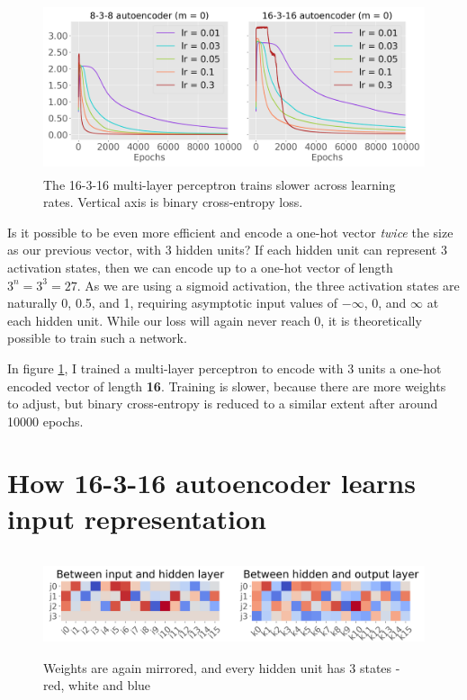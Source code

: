 \documentclass[12pt]{article}
\begin{document}
\begin{figure}[htbp]
    \centering
    \includegraphics[width=12cm, height=5cm]{mlp_8_16}
    \caption{The 16-3-16 multi-layer perceptron trains slower across learning rates. Vertical axis is binary cross-entropy loss.}
    \label{fig:mlp_8_16}
\end{figure}
Is it possible to be even more efficient and encode a one-hot vector \textit{twice} the size as our previous vector, with 3 hidden units? If each hidden unit can represent 3 activation states, then we can encode up to a one-hot vector of length $3^n = 3^3 = 27$. As we are using a sigmoid activation, the three activation states are naturally 0, 0.5, and 1, requiring asymptotic input values of $-\infty$, 0, and $\infty$ at each hidden unit. While our loss will again never reach 0, it is theoretically possible to train such a network.

In figure \ref{fig:mlp_8_16}, I trained a multi-layer perceptron to encode with 3 units a one-hot encoded vector of length \textbf{16}. Training is slower, because there are more weights to adjust, but binary cross-entropy is reduced to a similar extent after around 10000 epochs. 

\section{How 16-3-16 autoencoder learns input representation}

\begin{figure}
    \centering
    \includegraphics[height=3cm]{mlp16_w}
    \caption{Weights are again mirrored, and every hidden unit has 3 states - red, white and blue}
    \label{fig:mlp16_w}
\end{figure}
\end{document}
